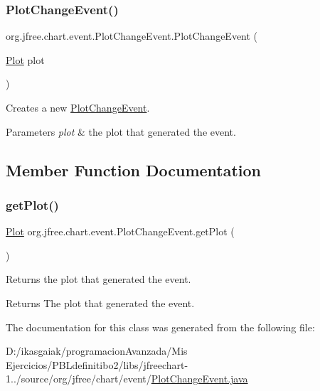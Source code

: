 \subsubsection{\texorpdfstring{Plot\+Change\+Event()}{PlotChangeEvent()}}
{\footnotesize\ttfamily org.\+jfree.\+chart.\+event.\+Plot\+Change\+Event.\+Plot\+Change\+Event (\begin{DoxyParamCaption}\item[{\mbox{\hyperlink{classorg_1_1jfree_1_1chart_1_1plot_1_1_plot}{Plot}}}]{plot }\end{DoxyParamCaption})}

Creates a new \mbox{\hyperlink{classorg_1_1jfree_1_1chart_1_1event_1_1_plot_change_event}{Plot\+Change\+Event}}.


\begin{DoxyParams}{Parameters}
{\em plot} & the plot that generated the event. \\
\hline
\end{DoxyParams}


\subsection{Member Function Documentation}
\mbox{\label{classorg_1_1jfree_1_1chart_1_1event_1_1_plot_change_event_a267aa078202c9ecc28706e0837b1063a}} 
\subsubsection{\texorpdfstring{get\+Plot()}{getPlot()}}
{\footnotesize\ttfamily \mbox{\hyperlink{classorg_1_1jfree_1_1chart_1_1plot_1_1_plot}{Plot}} org.\+jfree.\+chart.\+event.\+Plot\+Change\+Event.\+get\+Plot (\begin{DoxyParamCaption}{ }\end{DoxyParamCaption})}

Returns the plot that generated the event.

\begin{DoxyReturn}{Returns}
The plot that generated the event. 
\end{DoxyReturn}


The documentation for this class was generated from the following file\+:\begin{DoxyCompactItemize}
\item 
D\+:/ikasgaiak/programacion\+Avanzada/\+Mis Ejercicios/\+P\+B\+Ldefinitibo2/libs/jfreechart-\/1../source/org/jfree/chart/event/\mbox{\hyperlink{_plot_change_event_8java}{Plot\+Change\+Event.\+java}}\end{DoxyCompactItemize}
